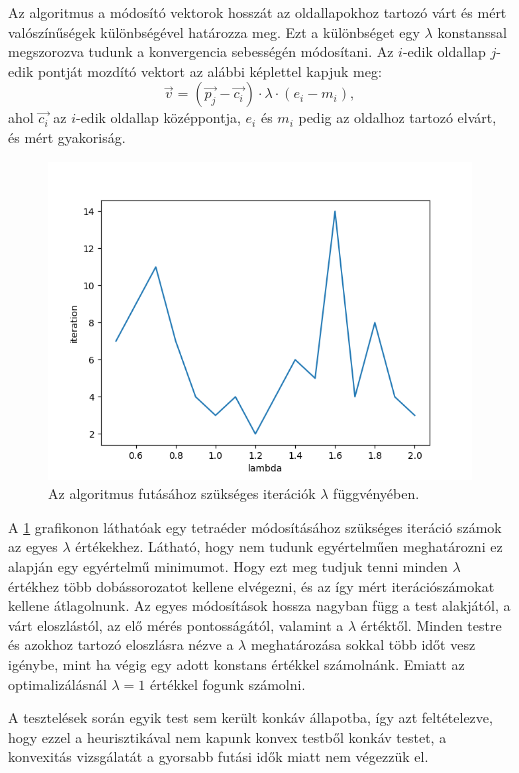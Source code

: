 Az algoritmus a módosító vektorok hosszát az oldallapokhoz tartozó várt és mért valószínűségek különbségével határozza meg.
Ezt a különbséget egy $\lambda$ konstanssal megszorozva tudunk a konvergencia sebességén módosítani.
Az $i$-edik oldallap $j$-edik pontját mozdító vektort az alábbi képlettel kapjuk meg:
\[
\vec{v} = (\vec{p_j} - \vec{c_i})\cdot\lambda\cdot(e_i - m_i),
\]
ahol $\vec{c_i}$ az $i$-edik oldallap középpontja, $e_i$ és $m_i$ pedig az oldalhoz tartozó elvárt, és mért gyakoriság.

\begin{figure}[h!]
	\centering
	\includegraphics[scale=0.7]{images/lambdatest.png}
	\caption{Az algoritmus futásához szükséges iterációk $\lambda$ függvényében.}
	\label{fig:lambda}
\end{figure}

A \ref{fig:lambda} grafikonon láthatóak egy tetraéder módosításához szükséges iteráció számok az egyes $\lambda$ értékekhez.
Látható, hogy nem tudunk egyértelműen meghatározni ez alapján egy egyértelmű minimumot.
Hogy ezt meg tudjuk tenni minden $\lambda$ értékhez több dobássorozatot kellene elvégezni, és az így mért iterációszámokat kellene átlagolnunk.
Az egyes módosítások hossza nagyban függ a test alakjától, a várt eloszlástól, az elő mérés pontosságától, valamint a $\lambda$ értéktől.
Minden testre és azokhoz tartozó eloszlásra nézve a $\lambda$ meghatározása sokkal több időt vesz igénybe, mint ha végig egy adott konstans értékkel számolnánk.
Emiatt az optimalizálásnál $\lambda = 1$ értékkel fogunk számolni.

\begin{remark}
A tesztelések során egyik test sem került konkáv állapotba, így azt feltételezve, hogy ezzel a heurisztikával nem kapunk konvex testből konkáv testet, a konvexitás vizsgálatát a gyorsabb futási idők miatt nem végezzük el.
\end{remark}